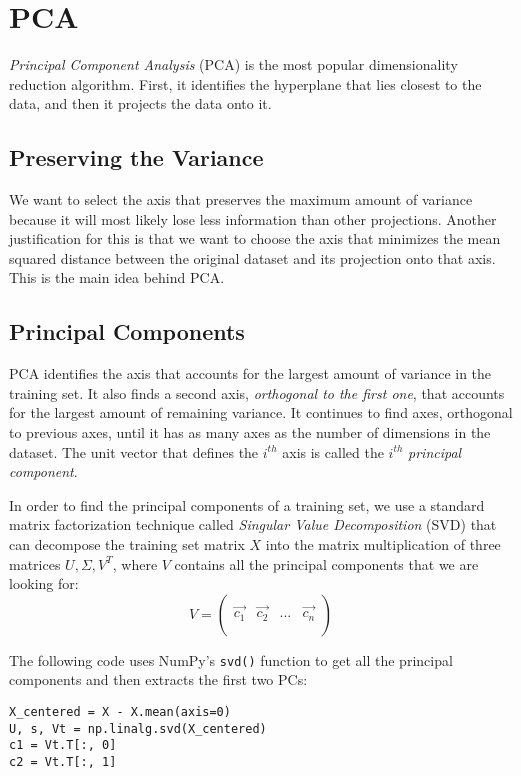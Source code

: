 \documentclass[letterpaper]{article}
\newcommand{\vect}[1]{\vec{#1}}
\begin{document}
\section{PCA} 
\textsl{Principal Component Analysis} (PCA) is the most popular dimensionality reduction algorithm. First, it identifies the hyperplane that lies closest to the data, and then it projects the data onto it. 

\subsection{Preserving the Variance}
We want to select the axis that preserves the maximum amount of variance because it will most likely lose less information than other projections. Another justification for this is that we want to choose the axis that minimizes the mean squared distance between the original dataset and its projection onto that axis. This is the main idea behind PCA. 

\subsection{Principal Components}
PCA identifies the axis that accounts for the largest amount of variance in the training set. It also finds a second axis, \textsl{orthogonal to the first one}, that accounts for the largest amount of remaining variance. It continues to find axes, orthogonal to previous axes, until it has as many axes as the number of dimensions in the dataset. The unit vector that defines the $i^{th}$ axis is called the $i^{th}$ \textsl{principal component}. 

In order to find the principal components of a training set, we use a standard matrix factorization technique called \textsl{Singular Value Decomposition} (SVD) that can decompose the training set matrix $X$ into the matrix multiplication of three matrices $U, \Sigma, V^{T}$, where $V$ contains all the principal components that we are looking for:
$$ V = \begin{pmatrix}
\\
\vect{c_{1}} & \vect{c_{2}} & ... & \vect{c_{n}}
\\
\\
\end{pmatrix}$$

\break
The following code uses NumPy's \texttt{svd()} function to get all the principal components and then extracts the first two PCs:
\begin{verbatim}
X_centered = X - X.mean(axis=0)
U, s, Vt = np.linalg.svd(X_centered)
c1 = Vt.T[:, 0]
c2 = Vt.T[:, 1]
\end{verbatim}
\end{document}
